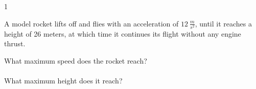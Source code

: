 
\AddToShipoutPicture*{\BackgroundPic}

\addtocounter {ProbNum} {1}

 
{\bf \Large{}} A model rocket lifts off and flies with an acceleration of ${12~\tfrac{m}{s^2}}$, until it reaches a height of 26 meters, at which time it continues its flight without any engine thrust.    \bigskip

What maximum speed does the rocket reach?\paragraph{}
\noindent
\vfill

What maximum height does it reach?

\vfill


\newpage